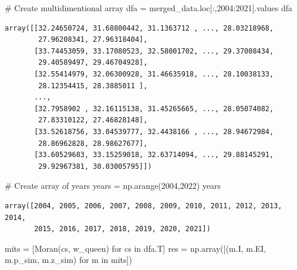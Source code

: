 \documentclass[
  letterpaper,
  DIV=11,
  numbers=noendperiod]{scrreprt}
\newenvironment{Shaded}{\begin{snugshade}}{\end{snugshade}}
\newcommand{\CommentTok}[1]{\textcolor[rgb]{0.37,0.37,0.37}{#1}}
\newcommand{\ControlFlowTok}[1]{\textcolor[rgb]{0.00,0.23,0.31}{#1}}
\newcommand{\DecValTok}[1]{\textcolor[rgb]{0.68,0.00,0.00}{#1}}
\newcommand{\KeywordTok}[1]{\textcolor[rgb]{0.00,0.23,0.31}{#1}}
\newcommand{\NormalTok}[1]{\textcolor[rgb]{0.00,0.23,0.31}{#1}}
\newcommand{\OperatorTok}[1]{\textcolor[rgb]{0.37,0.37,0.37}{#1}}
\newcommand{\StringTok}[1]{\textcolor[rgb]{0.13,0.47,0.30}{#1}}
\begin{document}
\begin{Shaded}
\begin{Highlighting}[]
\CommentTok{\# Create multidimentional array}
\NormalTok{dfa }\OperatorTok{=}\NormalTok{ merged\_data.loc[:,}\StringTok{\textquotesingle{}2004\textquotesingle{}}\NormalTok{:}\StringTok{\textquotesingle{}2021\textquotesingle{}}\NormalTok{].values}
\NormalTok{dfa}
\end{Highlighting}
\end{Shaded}

\begin{verbatim}
array([[32.24650724, 31.68800442, 31.1363712 , ..., 28.03218968,
        27.96208341, 27.96318404],
       [33.74453059, 33.17080523, 32.58001702, ..., 29.37008434,
        29.40589497, 29.46704928],
       [32.55414979, 32.06300928, 31.46635918, ..., 28.10038133,
        28.12354415, 28.3885011 ],
       ...,
       [32.7958902 , 32.16115138, 31.45265665, ..., 28.05074082,
        27.83310122, 27.46828148],
       [33.52618756, 33.04539777, 32.4438166 , ..., 28.94672984,
        28.86962828, 28.98627677],
       [33.60529683, 33.15259018, 32.63714094, ..., 29.88145291,
        29.92967381, 30.03005795]])
\end{verbatim}

\begin{Shaded}
\begin{Highlighting}[]
\CommentTok{\# Create array of years}
\NormalTok{years }\OperatorTok{=}\NormalTok{ np.arange(}\DecValTok{2004}\NormalTok{,}\DecValTok{2022}\NormalTok{)}
\NormalTok{years}
\end{Highlighting}
\end{Shaded}

\begin{verbatim}
array([2004, 2005, 2006, 2007, 2008, 2009, 2010, 2011, 2012, 2013, 2014,
       2015, 2016, 2017, 2018, 2019, 2020, 2021])
\end{verbatim}

\begin{Shaded}
\begin{Highlighting}[]
\NormalTok{mits }\OperatorTok{=}\NormalTok{ [Moran(cs, w\_queen) }\ControlFlowTok{for}\NormalTok{ cs }\KeywordTok{in}\NormalTok{ dfa.T]}
\NormalTok{res }\OperatorTok{=}\NormalTok{ np.array([(m.I, m.EI, m.p\_sim, m.z\_sim) }\ControlFlowTok{for}\NormalTok{ m }\KeywordTok{in}\NormalTok{ mits])}
\end{Highlighting}
\end{Shaded}
\end{document}
